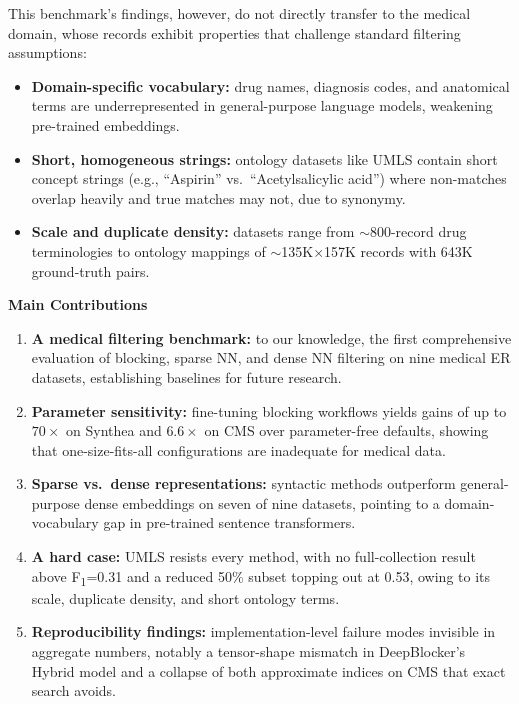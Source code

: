 \documentclass[runningheads]{llncs}
\begin{document}
This benchmark's findings, however, do not directly transfer to the medical domain, whose records exhibit properties that challenge standard filtering assumptions:
\begin{itemize}
    \item \textbf{Domain-specific vocabulary:} drug names, diagnosis codes, and anatomical terms are underrepresented in general-purpose language models, weakening pre-trained embeddings.
    \item \textbf{Short, homogeneous strings:} ontology datasets like UMLS contain short concept strings (e.g., ``Aspirin'' vs.\ ``Acetylsalicylic acid'') where non-matches overlap heavily and true matches may not, due to synonymy.
    \item \textbf{Scale and duplicate density:} datasets range from $\sim$800-record drug terminologies to ontology mappings of $\sim$135K$\times$157K records with 643K ground-truth pairs.
\end{itemize}

\noindent\textbf{Main Contributions}
\begin{enumerate}
    \item \textbf{A medical filtering benchmark:} to our knowledge, the first comprehensive
    evaluation of blocking, sparse NN, and dense NN filtering on nine medical ER datasets,
    establishing baselines for future research.
    \item \textbf{Parameter sensitivity:} fine-tuning blocking workflows yields gains of up to
    $70\times$ on Synthea and $6.6\times$ on CMS over parameter-free defaults, showing that
    one-size-fits-all configurations are inadequate for medical data.
    \item \textbf{Sparse vs.\ dense representations:} syntactic methods outperform
    general-purpose dense embeddings on seven of nine datasets, pointing to a
    domain-vocabulary gap in pre-trained sentence transformers.
    \item \textbf{A hard case:} UMLS resists every method, with no full-collection result
    above F\textsubscript{1}=0.31 and a reduced 50\% subset topping out at 0.53, owing to its
    scale, duplicate density, and short ontology terms.
    \item \textbf{Reproducibility findings:} implementation-level failure modes invisible in
    aggregate numbers, notably a tensor-shape mismatch in DeepBlocker's Hybrid model and a
    collapse of both approximate indices on CMS that exact search avoids.
\end{enumerate}
\end{document}
